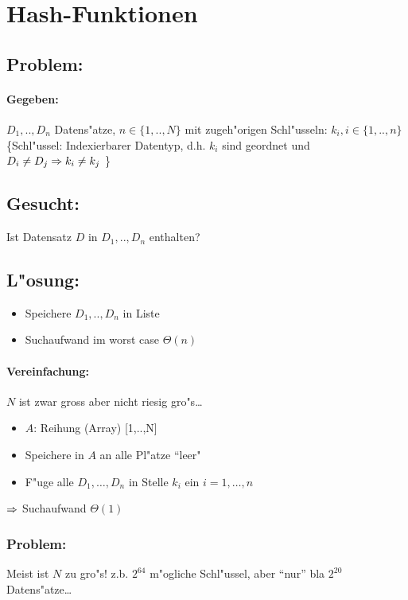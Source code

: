 \documentclass[a4paper]{scrartcl}
\begin{document}
\section{Hash-Funktionen}

\subsection*{Problem:}
	\paragraph{Gegeben:} $D_1,..,D_n$ Datens"atze, $n \in \{1,..,N\}$ mit zugeh"origen Schl"usseln: $k_i, i\in\{1,..,n\}$\\
	\{Schl"ussel: Indexierbarer Datentyp, d.h. $k_i$ sind geordnet und $D_i \ne D_j \Rightarrow k_i \ne k_j$ \}

\subsection*{Gesucht:} 
		Ist Datensatz $D$ in $D_1,..,D_n$ enthalten?
	
\subsection*{L"osung:}
\begin{itemize}
\item 
	Speichere $D_1,..,D_n$ in Liste 
\item 
	Suchaufwand im worst case $\Theta(n)$
\end{itemize}
\paragraph{Vereinfachung:} $N$ ist zwar gross aber nicht riesig gro"s\dots
\begin{itemize}
\item	$A$: Reihung (Array) [1,..,N]
\item	Speichere in $A$ an alle Pl"atze ``leer"
\item	F"uge alle $D_1,\dots,D_n$ in Stelle $k_i$ ein $i=1,\dots,n$
\end{itemize}
$\Rightarrow$ Suchaufwand $\Theta(1)$
		
\subsubsection*{Problem:}
		Meist ist $N$ zu gro"s!
			z.b. $2^{64}$ m"ogliche Schl"ussel, aber "`nur"' bla $2^{20}$ Datens"atze\dots
\end{document}
